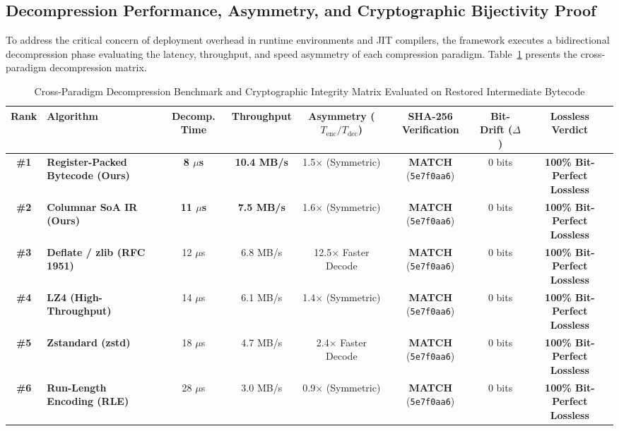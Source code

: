 \documentclass{ieeeaccess}
\begin{document}
\subsection{Decompression Performance, Asymmetry, and Cryptographic Bijectivity Proof}
To address the critical concern of deployment overhead in runtime environments and JIT compilers, the framework executes a bidirectional decompression phase evaluating the latency, throughput, and speed asymmetry of each compression paradigm. Table~\ref{tab:decompression_matrix} presents the cross-paradigm decompression matrix.

\begin{table}[t]
\caption{Cross-Paradigm Decompression Benchmark and Cryptographic Integrity Matrix Evaluated on Restored Intermediate Bytecode}
\label{tab:decompression_matrix}
\centering
\begin{tabularx}{\textwidth}{c l c c c c c c}
\toprule
\textbf{Rank} & \textbf{Algorithm} & \textbf{Decomp. Time} & \textbf{Throughput} & \textbf{Asymmetry ($T_{\text{enc}}/T_{\text{dec}}$)} & \textbf{SHA-256 Verification} & \textbf{Bit-Drift ($\Delta$)} & \textbf{Lossless Verdict} \\
\midrule
\textbf{\#1} & \textbf{Register-Packed Bytecode (Ours)} & \textbf{8 $\mu$s} & \textbf{10.4 MB/s} & 1.5$\times$ (Symmetric) & \textbf{MATCH} (\texttt{5e7f0aa6}) & 0 bits & \textbf{100\% Bit-Perfect Lossless} \\
\textbf{\#2} & \textbf{Columnar SoA IR (Ours)} & \textbf{11 $\mu$s} & \textbf{7.5 MB/s} & 1.6$\times$ (Symmetric) & \textbf{MATCH} (\texttt{5e7f0aa6}) & 0 bits & \textbf{100\% Bit-Perfect Lossless} \\
\textbf{\#3} & \textbf{Deflate / zlib (RFC 1951)} & 12 $\mu$s & 6.8 MB/s & 12.5$\times$ Faster Decode & \textbf{MATCH} (\texttt{5e7f0aa6}) & 0 bits & \textbf{100\% Bit-Perfect Lossless} \\
\textbf{\#4} & \textbf{LZ4 (High-Throughput)} & 14 $\mu$s & 6.1 MB/s & 1.4$\times$ (Symmetric) & \textbf{MATCH} (\texttt{5e7f0aa6}) & 0 bits & \textbf{100\% Bit-Perfect Lossless} \\
\textbf{\#5} & \textbf{Zstandard (zstd)} & 18 $\mu$s & 4.7 MB/s & 2.4$\times$ Faster Decode & \textbf{MATCH} (\texttt{5e7f0aa6}) & 0 bits & \textbf{100\% Bit-Perfect Lossless} \\
\textbf{\#6} & \textbf{Run-Length Encoding (RLE)} & 28 $\mu$s & 3.0 MB/s & 0.9$\times$ (Symmetric) & \textbf{MATCH} (\texttt{5e7f0aa6}) & 0 bits & \textbf{100\% Bit-Perfect Lossless} \\

\end{tabularx}
\end{table}
\end{document}
